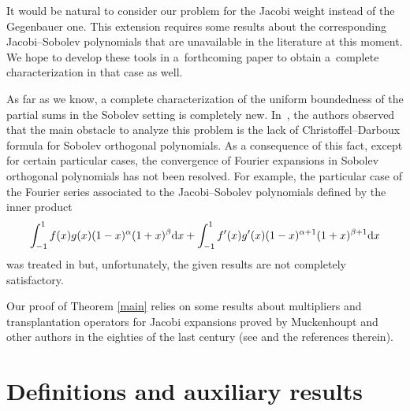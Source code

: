 \documentclass[11pt]{article}
\numberwithin{equation}{section}
\begin{document}
It would be natural to consider our problem for the Jacobi weight instead of the Gegenbauer one. This extension requires some results about the corresponding Jacobi--Sobolev polyno\-mials that are unavailable in the literature at this moment. We hope to develop these tools in a~forthcoming paper to obtain a~complete characterization in that case as well.

As far as we know, a complete characterization of the uniform boundedness of the partial sums in the Sobolev setting is completely new. In~\cite{Marce-Xu}, the authors observed that the main obstacle to analyze this problem is the lack of Christoffel--Darboux formula for Sobolev orthogonal polynomials. As a consequence of this fact, except for certain particular cases, the convergence of Fourier expansions in Sobolev orthogonal polynomials has not been resolved. For example, the particular case of the Fourier series associated to the Jacobi--Sobolev polynomials defined by the inner product
\begin{gather*}
\int_{-1}^{1} f(x)g(x)(1-x)^\alpha(1+x)^\beta {\rm d}x+ \int_{-1}^{1} f'(x)g'(x)(1-x)^{\alpha+1}(1+x)^{\beta+1} {\rm d}x
\end{gather*}
was treated in \cite{MQU} but, unfortunately, the given results are not completely satisfactory.


Our proof of Theorem \ref{main} relies on some results about multipliers and transplantation ope\-ra\-tors for Jacobi expansions proved by Muckenhoupt and other authors in the eighties of the last century (see \cite{muckenhoupt1} and the references therein).


\setcounter{section}{1}
\setcounter{subsection}{0}
\setcounter{subsubsection}{0}
\setcounter{thm}{3}
\setcounter{equation}{2}
\section{Definitions and auxiliary results}\label{section2}
\end{document}
